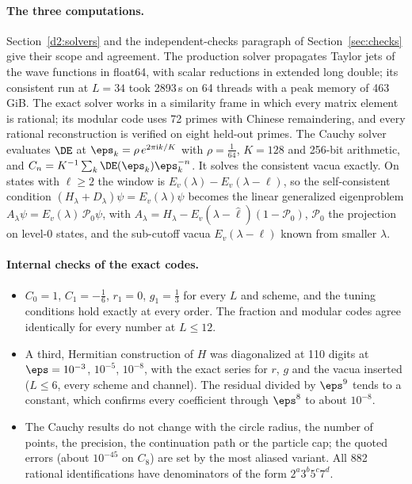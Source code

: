 \paragraph{The three computations.} Section~\ref{d2:solvers} and the independent-checks paragraph of
Section~\ref{sec:checks} give their scope and agreement. The production solver propagates Taylor jets of the wave
functions in float64, with scalar reductions in extended long double; its consistent run at $L=34$ took 2893\,s on 64
threads with a peak memory of 463\,GiB. The exact solver works in a similarity frame in which every matrix element is
rational; its modular code uses 72 primes with Chinese remaindering, and every rational reconstruction is verified on
eight held-out primes. The Cauchy solver evaluates $\DE$ at $\eps_k=\rho\,e^{2\pi\mathrm ik/K}$ with $\rho=\frac1{64}$,
$K=128$ and 256-bit arithmetic, and $C_n=K^{-1}\sum_k\DE(\eps_k)\eps_k^{-n}$. It solves the consistent vacua exactly. On states with
$\ell\ge2$ the window is $E_v(\lambda)-E_v(\lambda-\ell)$, so the self-consistent condition $(H_\lambda+D_\lambda)\psi=E_v(\lambda)\psi$
becomes the linear generalized eigenproblem $A_\lambda\psi=E_v(\lambda)\,\mathcal P_0\psi$, with
$A_\lambda=H_\lambda-E_v(\lambda-\hat\ell)(1-\mathcal P_0)$, $\mathcal P_0$ the projection on level-0 states, and the
sub-cutoff vacua $E_v(\lambda-\ell)$ known from smaller $\lambda$.

\paragraph{Internal checks of the exact codes.}
\begin{itemize}
\item $C_0=1$, $C_1=-\frac16$, $r_1=0$, $g_1=\frac13$ for every $L$ and scheme, and the tuning conditions hold exactly at
 every order. The fraction and modular codes agree identically for every number at $L\le12$.
\item A third, Hermitian construction of $H$ was diagonalized at 110 digits at $\eps=10^{-3}$, $10^{-5}$, $10^{-8}$, with the
 exact series for $r$, $g$ and the vacua inserted ($L\le6$, every scheme and channel). The residual divided by $\eps^9$
 tends to a constant, which confirms every coefficient through $\eps^8$ to about $10^{-8}$.
\item The Cauchy results do not change with the circle radius, the number of points, the precision, the continuation path
 or the particle cap; the quoted errors (about $10^{-45}$ on $C_8$) are set by the most aliased variant. All 882 rational
 identifications have denominators of the form $2^a3^b5^c7^d$.
\end{itemize}

